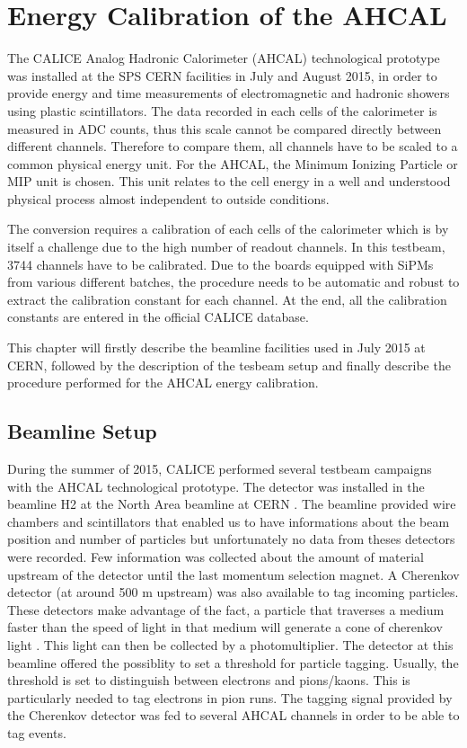 \chapter{Energy Calibration of the AHCAL}
\label{chap:ECalibAHCAL}

The CALICE Analog Hadronic Calorimeter (AHCAL) technological prototype was installed at the SPS CERN facilities in July and August 2015, in order to provide energy and time measurements of electromagnetic and hadronic showers using plastic scintillators. The data recorded in each cells of the calorimeter is measured in ADC counts, thus this scale cannot be compared directly between different channels. Therefore to compare them, all channels have to be scaled to a common physical energy unit. For the AHCAL, the Minimum Ionizing Particle or MIP unit is chosen. This unit relates to the cell energy in a well and understood physical process almost independent to outside conditions.

The conversion requires a calibration of each cells of the calorimeter which is by itself a challenge due to the high number of readout channels. In this testbeam, 3744 channels have to be calibrated. Due to the boards equipped with SiPMs from various different batches, the procedure needs to be automatic and robust to extract the calibration constant for each channel. At the end, all the calibration constants are entered in the official CALICE database.

This chapter will firstly describe the beamline facilities used in July 2015 at CERN, followed by the description of the tesbeam setup and finally describe the procedure performed for the AHCAL energy calibration.

\section{Beamline Setup}

During the summer of 2015, CALICE performed several testbeam campaigns with the AHCAL technological prototype. The detector was installed in the beamline H2 at the North Area beamline at CERN \cite{H2Beamline}. The beamline provided wire chambers and scintillators that enabled us to have informations about the beam position and number of particles but unfortunately no data from theses detectors were recorded. Few information was collected about the amount of material upstream of the detector until the last momentum selection magnet. A Cherenkov detector (at around 500 m upstream) was also available to tag incoming particles. These detectors make advantage of the fact, a particle that traverses a medium faster than the speed of light in that medium will generate a cone of cherenkov light \cite{}. This light can then be collected by a photomultiplier. The detector at this beamline offered the possiblity to set a threshold for particle tagging. Usually, the threshold is set to distinguish between electrons and pions/kaons. This is particularly needed to tag electrons in pion runs. The tagging signal provided by the Cherenkov detector was fed to several AHCAL channels in order to be able to tag events.\\

